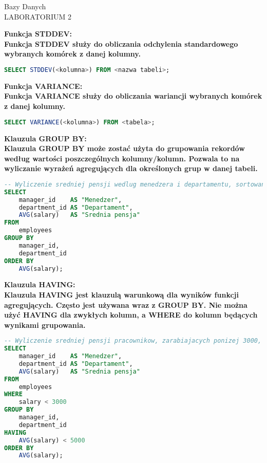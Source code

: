 \documentclass[a4paper,12pt]{article}
\newcommand{\h}[1]{\noindent \bf #1 \rm \\ \noindent}
\begin{document}
	
\begin{center}
	\LARGE
	Bazy Danych \\
	\large
	LABORATORIUM 2 
\end{center}
\vspace{1cm}	
	
\h{Funkcja STDDEV:}
Funkcja STDDEV służy do obliczania odchylenia standardowego wybranych komórek z danej kolumny.
\begin{lstlisting}[language=SQL]
SELECT STDDEV(<kolumna>) FROM <nazwa tabeli>;
\end{lstlisting}
\vspace{5mm}

\h{Funkcja VARIANCE:}
Funkcja VARIANCE służy do obliczania wariancji wybranych komórek z danej kolumny.
\begin{lstlisting}[language=SQL]
SELECT VARIANCE(<kolumna>) FROM <tabela>;
\end{lstlisting}
\vspace{5mm}	

\h{Klauzula GROUP BY:}
Klauzula GROUP BY może zostać użyta do grupowania rekordów według wartości poszczególnych kolumny/kolumn. Pozwala to na wyliczanie wyrażeń agregujących dla określonych grup w danej tabeli.
\begin{lstlisting}[language=SQL]
-- Wyliczenie sredniej pensji wedlug menedzera i departamentu, sortowane rosnaco po sredniej pensji
SELECT 
	manager_id 	  AS "Menedzer", 
	department_id AS "Departament", 
	AVG(salary)   AS "Srednia pensja"
FROM 
	employees
GROUP BY
	manager_id,
	department_id
ORDER BY
	AVG(salary);
\end{lstlisting}
\vspace{5mm}

\newpage
\h{Klauzula HAVING:}
Klauzula HAVING jest klauzulą warunkową dla wyników funkcji agregujących. Często jest używana wraz z GROUP BY. Nie można użyć HAVING dla zwykłych kolumn, a WHERE do kolumn będących wynikami grupowania.
\begin{lstlisting}[language=SQL]
-- Wyliczenie sredniej pensji pracownikow, zarabiajacych ponizej 3000, mniejszej niz 5000, wedlug menedzera i departamentu, sortowane rosnaco po sredniej pensji
SELECT 
	manager_id 	  AS "Menedzer", 
	department_id AS "Departament", 
	AVG(salary)   AS "Srednia pensja"
FROM 
	employees
WHERE
	salary < 3000
GROUP BY
	manager_id,
	department_id
HAVING
	AVG(salary) < 5000
ORDER BY
	AVG(salary);
\end{lstlisting}
\vspace{5mm}
\end{document}
